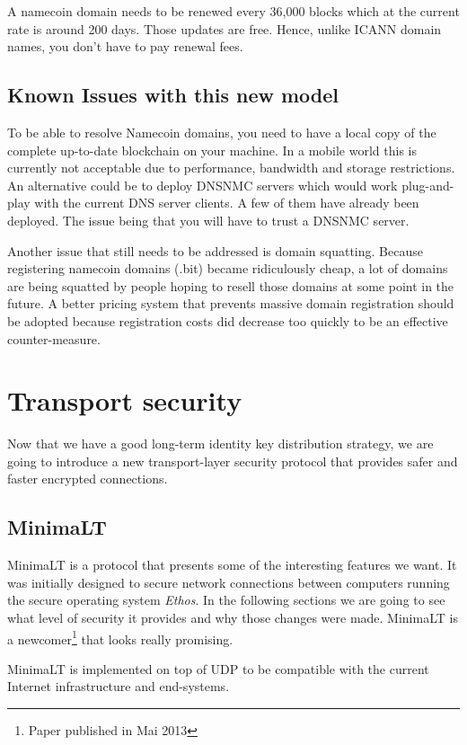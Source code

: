 \documentclass{vldb}
\begin{document}
A namecoin domain needs to be renewed every 36,000 blocks which at the current rate is around 200 days. Those updates are free. Hence, unlike ICANN domain names, you don't have to pay renewal fees.

\subsection{Known Issues with this new model}

To be able to resolve Namecoin domains, you need to have a local copy  of the complete up-to-date blockchain on your machine. In a mobile world this is currently not acceptable due to performance, bandwidth and storage restrictions. An alternative could be to deploy DNSNMC servers which would work plug-and-play with the current DNS server clients. A few of them have already been deployed. The issue being that you will have to trust a DNSNMC server.

Another issue that still needs to be addressed is domain squatting. Because registering namecoin domains (.bit) became ridiculously cheap, a lot of domains are being squatted by people hoping to resell those domains at some point in the future. A better pricing system that prevents massive domain registration should be adopted because registration costs did decrease too quickly to be an effective counter-measure.

\section{Transport security}


Now that we have a good long-term identity key distribution strategy, we are going to introduce a new transport-layer security protocol that provides safer and faster encrypted connections.
\subsection{MinimaLT}
MinimaLT\cite{MinimaLT} is a protocol that presents some of the interesting features we want. It was initially designed to secure network connections between computers running the secure operating system \emph{Ethos}. In the following sections we are going to see what level of security it provides and why those changes were made. MinimaLT is a newcomer\footnote{Paper published in Mai 2013} that looks really promising.

MinimaLT is implemented on top of UDP to be compatible with the current Internet infrastructure and end-systems.   
\end{document}
